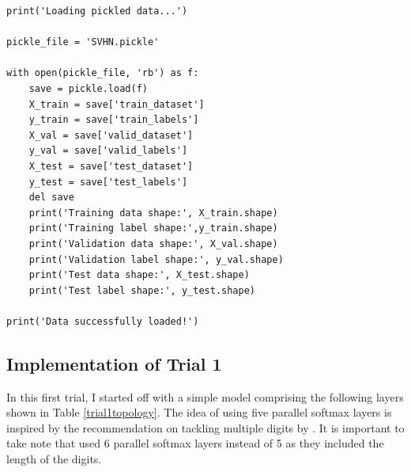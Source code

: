 \documentclass[twoside, column]{article}
\begin{document}
\begin{verbatim}
print('Loading pickled data...')

pickle_file = 'SVHN.pickle'

with open(pickle_file, 'rb') as f:
    save = pickle.load(f)
    X_train = save['train_dataset']
    y_train = save['train_labels']
    X_val = save['valid_dataset']
    y_val = save['valid_labels']
    X_test = save['test_dataset']
    y_test = save['test_labels']
    del save  
    print('Training data shape:', X_train.shape)
    print('Training label shape:',y_train.shape)
    print('Validation data shape:', X_val.shape)
    print('Validation label shape:', y_val.shape)
    print('Test data shape:', X_test.shape)
    print('Test label shape:', y_test.shape)
    
print('Data successfully loaded!')
 \end{verbatim}
 

\subsection{Implementation of Trial 1}

In this first trial, I started off with a simple model comprising the following layers shown in Table \ref{trial1topology}. The idea of using five parallel softmax layers is inspired by the recommendation on tackling multiple digits by \cite{Netzer:2011aa}. It is important to take note that \cite{Netzer:2011aa} used 6 parallel softmax layers instead of 5 as they included the length of the digits. 
\end{document}
